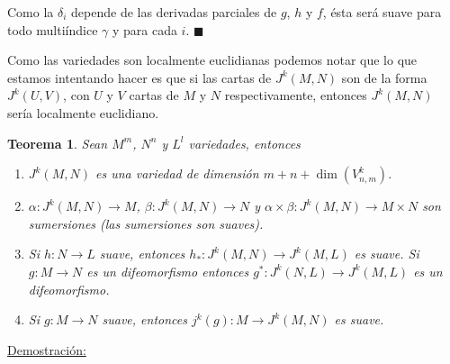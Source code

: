 \documentclass{report}
\newtheorem{theorem}{Teorema}[section]
\theoremstyle{definition}
\begin{document}
Como la $\delta_i$ depende de las derivadas parciales de $g$, $h$ y $f$, \'esta ser\'a suave para todo multi\'indice $\gamma$ y para cada $i$. $\blacksquare$

Como las variedades son localmente euclidianas podemos notar que lo que estamos intentando hacer es que si las cartas de $J^k (M, N)$ son de la forma $J^k (U,V)$, con $U$ y $V$ cartas de $M$ y $N$ respectivamente, entonces $J^k(M,N)$ ser\'ia localmente euclidiano.

\begin{theorem}
Sean $M^m$, $N^n$ y $L^l$ variedades, entonces
\begin{enumerate}
\item $J^k (M , N)$ es una variedad de dimensi\'on $m + n + \dim (V_{n , m}^k)$.
\item $\alpha: J^k (M, N) \to M$, $\beta: J^k (M , N) \to N$ y $\alpha \times \beta: J^k (M , N) \to M \times N$ son sumersiones (las sumersiones son suaves).
\item Si $h: N \to L$ suave, entonces $h_\ast: J^k (M , N ) \to J^k (M, L)$ es suave. Si $g : M \to N$ es un difeomorfismo entonces $g^\ast : J^k (N, L) \to J^k ( M, L) $ es un difeomorfismo.
\item Si $g: M \to N$ suave, entonces $j^k (g): M \to J^k (M,N)$ es suave.
\end{enumerate}
\end{theorem}
\underline{Demostraci\'on:}
\end{document}
